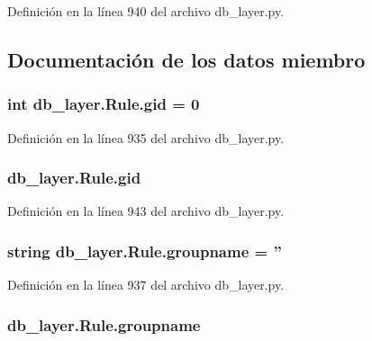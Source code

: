 Definición en la línea 940 del archivo db\-\_\-layer.\-py.



\subsection{Documentación de los datos miembro}
\hypertarget{classdb__layer_1_1_rule_acc2d1385294c5f2e6c904d5d45f6b993}{
\subsubsection[{gid}]{\setlength{\rightskip}{0pt plus 5cm}int db\-\_\-layer.\-Rule.\-gid = 0\hspace{0.3cm}{\ttfamily [static]}}}\label{classdb__layer_1_1_rule_acc2d1385294c5f2e6c904d5d45f6b993}


Definición en la línea 935 del archivo db\-\_\-layer.\-py.

\hypertarget{classdb__layer_1_1_rule_a91b3762b7d9fff303d381673fa4d2b7e}{
\subsubsection[{gid}]{\setlength{\rightskip}{0pt plus 5cm}db\-\_\-layer.\-Rule.\-gid}}\label{classdb__layer_1_1_rule_a91b3762b7d9fff303d381673fa4d2b7e}


Definición en la línea 943 del archivo db\-\_\-layer.\-py.

\hypertarget{classdb__layer_1_1_rule_a34a1b2f08b6ff459e4a4ab84ddf6732e}{
\subsubsection[{groupname}]{\setlength{\rightskip}{0pt plus 5cm}string db\-\_\-layer.\-Rule.\-groupname = ''\hspace{0.3cm}{\ttfamily [static]}}}\label{classdb__layer_1_1_rule_a34a1b2f08b6ff459e4a4ab84ddf6732e}


Definición en la línea 937 del archivo db\-\_\-layer.\-py.

\hypertarget{classdb__layer_1_1_rule_a55660655f1b48f3f9f6c564781e7146b}{
\subsubsection[{groupname}]{\setlength{\rightskip}{0pt plus 5cm}db\-\_\-layer.\-Rule.\-groupname}}\label{classdb__layer_1_1_rule_a55660655f1b48f3f9f6c564781e7146b}


